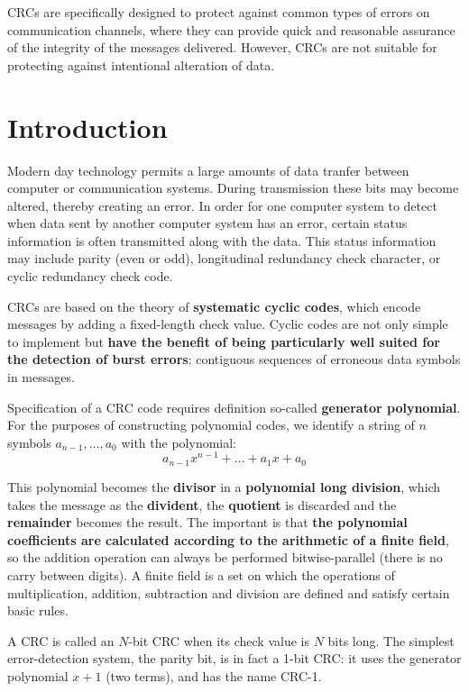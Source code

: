 \documentclass[fleqn]{IEEEtran}
\begin{document}
CRCs are specifically designed to protect against common types of errors 
on communication channels, where they can provide quick and reasonable 
assurance of the integrity of the messages delivered. However, CRCs are
not suitable for protecting against intentional alteration of data.


\section{Introduction}
Modern day technology permits a large amounts of data tranfer between 
computer or communication systems. During transmission these bits may become 
altered, thereby creating an error. In order for one computer system to detect 
when data sent by another computer system has an error, certain status 
information is often transmitted along with the data. This status information 
may include parity (even or odd), longitudinal redundancy check character, 
or cyclic redundancy check code.

CRCs are based on the theory of \textbf{systematic cyclic codes}, which encode 
messages by adding a fixed-length check value. Cyclic codes are not only simple
to implement but \textbf{have the benefit of being particularly well suited 
for the detection of burst errors}: contiguous sequences of erroneous data 
symbols in messages.

Specification of a CRC code requires definition so-called 
\textbf{generator polynomial}. For the purposes of constructing polynomial codes, 
we identify a string of $n$ symbols $a_{n-1},\dots{},a_{0}$ with the polynomial:
\[
   a_{n-1}x^{n-1}+\dots{}+a_{1}x+a_{0}
\]

This polynomial becomes the \textbf{divisor} in a 
\textbf{polynomial long division}, which takes the message as the 
\textbf{divident}, the \textbf{quotient} is discarded and the 
\textbf{remainder} becomes the result. The important is that \textbf{the 
polynomial coefficients are calculated according to the arithmetic of a finite 
field}, so the addition operation can always be performed bitwise-parallel 
(there is no carry between digits). A finite field is a set on which the 
operations of multiplication, addition, subtraction and division are 
defined and satisfy certain basic rules.

A CRC is called an $N$-bit CRC when its check value is $N$ bits long. The 
simplest error-detection system, the parity bit, is in fact a 1-bit CRC: 
it uses the generator polynomial $x + 1$ (two terms), and has the name CRC-1.
\end{document}
